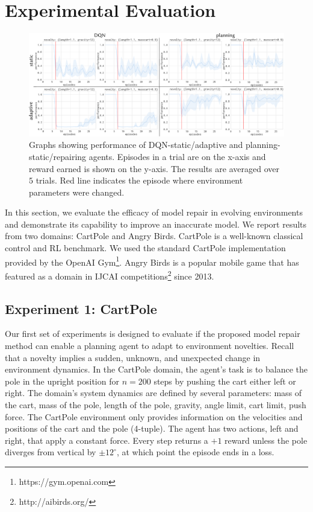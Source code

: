 \documentclass[letterpaper]{article} %
\begin{document}
\section{Experimental Evaluation}
\begin{figure}
    \centering
    \includegraphics[width=1\textwidth]{figures/experiments/combined.pdf}
    \caption{Graphs showing performance of DQN-static/adaptive and planning-static/repairing agents. Episodes in a trial are on the x-axis and reward earned is shown on the y-axis. The results are averaged over $5$ trials. Red line indicates the episode where environment parameters were changed.}
    \label{fig:combined_results}
\end{figure}
In this section, we evaluate the efficacy of model repair in evolving environments and demonstrate its capability to improve an inaccurate model. We report results from two domains: CartPole and Angry Birds. CartPole is a well-known classical control and RL benchmark. We used the standard CartPole implementation provided by the OpenAI Gym\footnote{https://gym.openai.com}. Angry Birds is a popular mobile game that has featured as a domain in IJCAI competitions\footnote{http://aibirds.org/} since 2013.

\subsection{Experiment 1: CartPole}
Our first set of experiments is designed to evaluate if the proposed model repair method can enable a planning agent to adapt to environment novelties. Recall that a novelty implies a sudden, unknown, and unexpected change in environment dynamics. In the CartPole domain, the agent's task is to balance the pole in the upright position for $n=200$ steps by pushing the cart either left or right. The domain's system dynamics are defined by several parameters: mass of the cart, mass of the pole, length of the pole, gravity, angle limit, cart limit, push force. The CartPole environment only provides information on the velocities and positions of the cart and the pole (4-tuple). The agent has two actions, left and right, that apply a constant force. Every step returns a $+1$ reward unless the pole diverges from vertical by $\pm 12^{\circ}$, at which point the episode ends in a loss.
\end{document}
